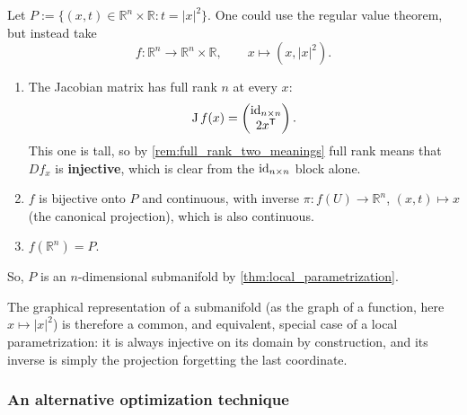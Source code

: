 \begin{example}
Let $P := \{(x,t) \in \mathbb{R}^n\times\mathbb{R} : t=|x|^2\}$. One could use the regular value
theorem, but instead take
\[f : \mathbb{R}^n \to \mathbb{R}^n\times\mathbb{R}, \qquad x \mapsto (x,|x|^2).\]
\begin{enumerate}[label=\textbf{(\alph*)}]
  \item The Jacobian matrix has full rank $n$ at every $x$:
\[ \operatorname{J} f(x) = \begin{pmatrix} \operatorname{id}_{n\times n} \\ 2x^{\mathsf{T}} \end{pmatrix}. \]
    This one is tall, so by \cref{rem:full_rank_two_meanings} full rank means that $Df_x$ is
    \textbf{injective}, which is clear from the $\operatorname{id}_{n\times n}$ block alone.
  \item $f$ is bijective onto $P$ and continuous, with inverse $\pi : f(U) \to \mathbb{R}^n$,
    $(x,t) \mapsto x$ (the canonical projection), which is also continuous.
  \item $f(\mathbb{R}^n) = P$.
\end{enumerate}
So, $P$ is an $n$-dimensional submanifold by \cref{thm:local_parametrization}.

\begin{remark}
The graphical representation of a submanifold (as the graph of a function, here $x \mapsto |x|^2$)
is therefore a common, and equivalent, special case of a local parametrization: it is always
injective on its domain by construction, and its inverse is simply the projection forgetting the
last coordinate.
\end{remark}
\end{example}

\begin{center}
\end{center}

\subsubsection{An alternative optimization technique}

